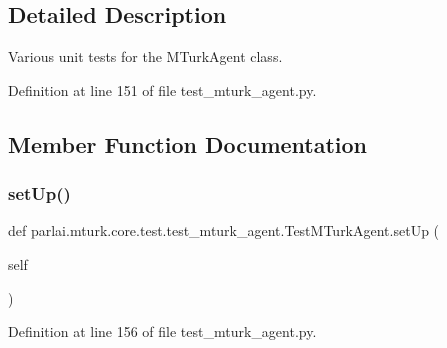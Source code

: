 \subsection{Detailed Description}
\begin{DoxyVerb}Various unit tests for the MTurkAgent class.
\end{DoxyVerb}
 

Definition at line 151 of file test\+\_\+mturk\+\_\+agent.\+py.



\subsection{Member Function Documentation}
\mbox{\label{classparlai_1_1mturk_1_1core_1_1test_1_1test__mturk__agent_1_1TestMTurkAgent_a44bfe2c1347d96d53b880dd54abb2403}} 
\subsubsection{\texorpdfstring{set\+Up()}{setUp()}}
{\footnotesize\ttfamily def parlai.\+mturk.\+core.\+test.\+test\+\_\+mturk\+\_\+agent.\+Test\+M\+Turk\+Agent.\+set\+Up (\begin{DoxyParamCaption}\item[{}]{self }\end{DoxyParamCaption})}



Definition at line 156 of file test\+\_\+mturk\+\_\+agent.\+py.


